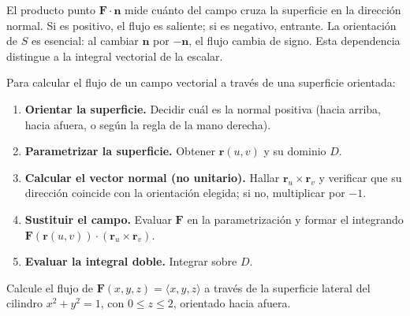 \begin{rem}
El producto punto $\mathbf{F}\cdot\mathbf{n}$ mide cuánto del campo cruza la superficie en la dirección normal. Si es positivo, el flujo es saliente; si es negativo, entrante. La orientación de $S$ es esencial: al cambiar $\mathbf{n}$ por $-\mathbf{n}$, el flujo cambia de signo. Esta dependencia distingue a la integral vectorial de la escalar.
\end{rem}

\begin{pasos}
Para calcular el flujo de un campo vectorial a través de una superficie orientada:
\begin{enumerate}
\item \textbf{Orientar la superficie.} Decidir cuál es la normal positiva (hacia arriba, hacia afuera, o según la regla de la mano derecha).
\item \textbf{Parametrizar la superficie.} Obtener $\mathbf{r}(u,v)$ y su dominio $D$.
\item \textbf{Calcular el vector normal (no unitario).} Hallar $\mathbf{r}_u \times \mathbf{r}_v$ y verificar que su dirección coincide con la orientación elegida; si no, multiplicar por $-1$.
\item \textbf{Sustituir el campo.} Evaluar $\mathbf{F}$ en la parametrización y formar el integrando $\mathbf{F}(\mathbf{r}(u,v)) \cdot (\mathbf{r}_u \times \mathbf{r}_v)$.
\item \textbf{Evaluar la integral doble.} Integrar sobre $D$.
\end{enumerate}
\end{pasos}

\begin{example}
Calcule el flujo de $\mathbf{F}(x,y,z)=\langle x,y,z\rangle$ a través de la superficie lateral del cilindro $x^2+y^2=1$, con $0\le z\le 2$, orientado hacia afuera.
\end{example}

